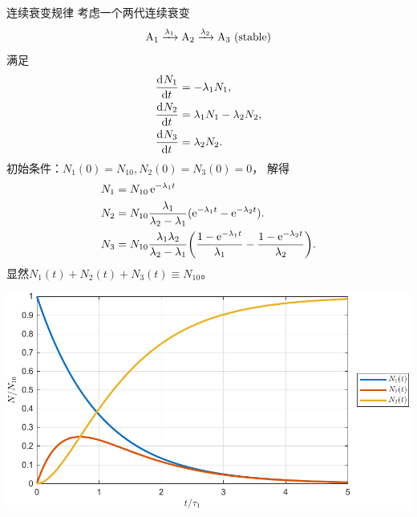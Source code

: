 \begin{example}
	{连续衰变规律}{}
	考虑一个两代连续衰变
	\[
		\mathrm{A}_1\xrightarrow[]{\lambda_1}\mathrm{A}_2\xrightarrow[]{\lambda_2}\mathrm{A}_3\text{ (stable)}
	\]
	满足
	\begin{subequations}
		\begin{align}
			\frac{\mathrm{d}^{{}}N_1}{\mathrm{d}{t}^{{}}}&=-\lambda_1N_1,\\
			\frac{\mathrm{d}^{{}}N_2}{\mathrm{d}{t}^{{}}}&=\lambda_1N_1-\lambda_2N_2,\\
			\frac{\mathrm{d}^{{}}N_3}{\mathrm{d}{t}^{{}}}&=\lambda_2N_2.
		\end{align}
	\end{subequations}
	初始条件：$N_1(0)=N_{10},N_2(0)=N_3(0)=0$，
	解得
	\begin{subequations}
		\label{eq:decay2}
		\begin{align}
			N_1&=N_{10}\mathop{}\!\mathrm{e}^{-\lambda_1t}\\
			\label{eq:decay2 N2}
			N_2&=N_{10}\frac{\lambda_1}{\lambda_2-\lambda_1}(\mathop{}\!\mathrm{e}^{-\lambda_1t}-\mathop{}\!\mathrm{e}^{-\lambda_2t}).\\
			N_3&=N_{10}\frac{\lambda_1\lambda_2}{\lambda_2-\lambda_1}\biggl(\frac{1-\mathop{}\!\mathrm{e}^{-\lambda_1t}}{\lambda_1}-\frac{1-\mathop{}\!\mathrm{e}^{-\lambda_2t}}{\lambda_2}\biggr).
		\end{align}
	\end{subequations}
	显然$N_1(t)+N_2(t)+N_3(t)\equiv N_{10}$。
	\begin{center}
		\includegraphics[width=0.8\linewidth]{figures/decay2.pdf}
		\label{fig:decay2}
	\end{center}

	\tcblower


\end{example}
